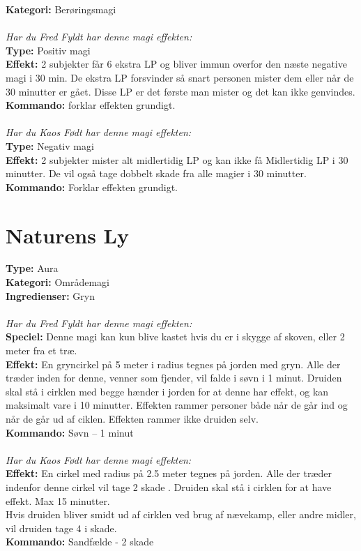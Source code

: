 \begin{nvit*}
\textbf{Kategori:} Berøringsmagi\\
\\
\emph{\textit{Har du Fred Fyldt har denne magi effekten:}}\\
\textbf{Type:} Positiv magi \\
\textbf{Effekt:} 2 subjekter får 6 ekstra LP og bliver immun overfor den næste negative magi i 30 min. De ekstra LP forsvinder så snart personen mister dem eller når de 30 minutter er gået. Disse LP er det første man mister og det kan ikke genvindes.\\
\textbf{Kommando:} forklar effekten grundigt.\\
\\
\emph{\textit{Har du Kaos Født har denne magi effekten:}}\\
\textbf{Type:} Negativ magi\\ 
\textbf{Effekt:} 2 subjekter mister alt midlertidig LP og kan ikke få Midlertidig LP i 30 minutter. De vil også tage dobbelt skade fra alle magier i 30 minutter.\\
\textbf{Kommando:} Forklar effekten grundigt.\\
\end{nvit*}

\newpage
\section{Naturens Ly}

\begin{nly*}
\textbf{Type:} Aura \\
\textbf{Kategori:} Områdemagi\\
\textbf{Ingredienser:} Gryn\\
\\
\emph{\textit{Har du Fred Fyldt har denne magi effekten:}}\\
\textbf{Speciel:} Denne magi kan kun blive kastet hvis du er i skygge af skoven, eller 2 meter fra et træ.\\
\textbf{Effekt:} En gryncirkel på 5 meter i radius tegnes på jorden med gryn. Alle der træder inden for denne, venner som fjender, vil falde i søvn i 1 minut. Druiden skal stå i cirklen med begge hænder i jorden for at denne har effekt, og kan maksimalt vare i 10 minutter. Effekten rammer personer både når de går ind og når de går ud af ciklen. Effekten rammer ikke druiden selv.\\
\textbf{Kommando:} Søvn – 1 minut\\
\\
\emph{\textit{Har du Kaos Født har denne magi effekten:}}\\
\textbf{Effekt:} En cirkel med radius på 2.5 meter tegnes på jorden. Alle der træder indenfor denne cirkel vil tage 2
skade . Druiden skal stå i cirklen for at have effekt. Max 15 minutter. \\ 
Hvis druiden bliver smidt ud af cirklen ved brug af nævekamp, eller andre midler, vil druiden tage 4 i skade.\\
\textbf{Kommando:} Sandfælde - 2 skade
\end{nly*}

